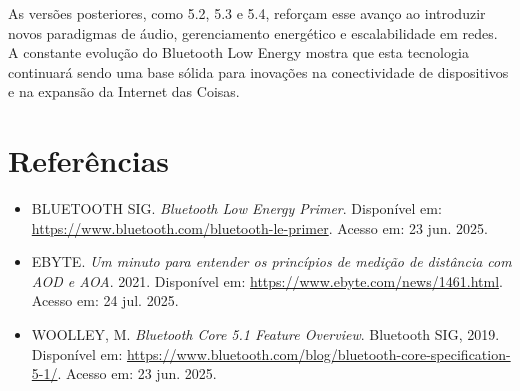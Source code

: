\documentclass[12pt,a4paper]{report}
\begin{document}
As versões posteriores, como 5.2, 5.3 e 5.4, reforçam esse avanço ao introduzir novos paradigmas de áudio, gerenciamento energético e escalabilidade em redes. A constante evolução do Bluetooth Low Energy mostra que esta tecnologia continuará sendo uma base sólida para inovações na conectividade de dispositivos e na expansão da Internet das Coisas.

\chapter{Referências}
\begin{itemize}
    \item BLUETOOTH SIG. \textit{Bluetooth Low Energy Primer}. Disponível em: \url{https://www.bluetooth.com/bluetooth-le-primer}. Acesso em: 23 jun. 2025.
    \item EBYTE. \textit{Um minuto para entender os princípios de medição de distância com AOD e AOA}. 2021. Disponível em: \url{https://www.ebyte.com/news/1461.html}. Acesso em: 24 jul. 2025.
    \item WOOLLEY, M. \textit{Bluetooth Core 5.1 Feature Overview}. Bluetooth SIG, 2019. Disponível em: \url{https://www.bluetooth.com/blog/bluetooth-core-specification-5-1/}. Acesso em: 23 jun. 2025.
\end{itemize}
\end{document}

